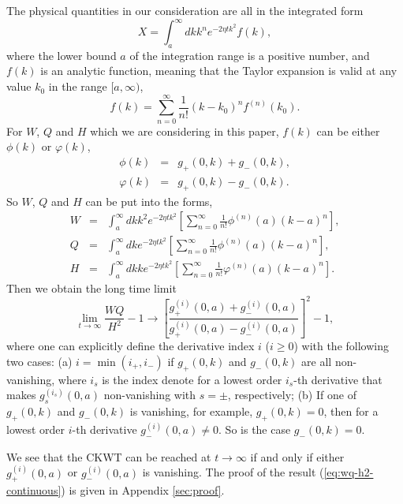 \documentclass[english,aps,superscriptaddress,preprint]{revtex4-1}
\begin{document}
The physical quantities in our consideration are all in the integrated
form 
\begin{equation}
X=\int_{a}^{\infty}dkk^{n}e^{-2\eta tk^{2}}f(k),
\end{equation}
where the lower bound $a$ of the integration range is a positive
number, and $f(k)$ is an analytic function, meaning that the Taylor
expansion is valid at any value $k_{0}$ in the range $[a,\infty)$,
\begin{equation}
f(k)=\sum_{n=0}^{\infty}\frac{1}{n!}\left(k-k_{0}\right)^{n}f^{(n)}(k_{0}).
\end{equation}
For $W$, $Q$ and $H$ which we are considering in this paper, $f(k)$
can be either $\phi(k)$ or $\varphi(k)$, 
\begin{eqnarray}
\phi(k) & = & g_{+}(0,k)+g_{-}(0,k),\nonumber \\
\varphi(k) & = & g_{+}(0,k)-g_{-}(0,k).\label{eq:phi-beta}
\end{eqnarray}
So $W$, $Q$ and $H$ can be put into the forms, 
\begin{eqnarray}
W & = & \int_{a}^{\infty}dkk^{2}e^{-2\eta tk^{2}}\left[\sum_{n=0}^{\infty}\frac{1}{n!}\phi^{(n)}(a)\left(k-a\right)^{n}\right],\nonumber \\
Q & = & \int_{a}^{\infty}dke^{-2\eta tk^{2}}\left[\sum_{n=0}^{\infty}\frac{1}{n!}\phi^{(n)}(a)\left(k-a\right)^{n}\right],\nonumber \\
H & = & \int_{a}^{\infty}dkke^{-2\eta tk^{2}}\left[\sum_{n=0}^{\infty}\frac{1}{n!}\varphi^{(n)}\left(a\right)\left(k-a\right)^{n}\right].
\end{eqnarray}
Then we obtain the long time limit 
\begin{equation}
\lim_{t\rightarrow\infty}\frac{WQ}{H^{2}}-1\rightarrow\left[\frac{g_{+}^{(i)}(0,a)+g_{-}^{(i)}(0,a)}{g_{+}^{(i)}(0,a)-g_{-}^{(i)}(0,a)}\right]^{2}-1,\label{eq:wq-h2-continuous}
\end{equation}
where one can explicitly define the derivative index $i$ ($i\geq0$)
with the following two cases: (a) $i=\min(i_{+},i_{-})$ if $g_{+}(0,k)$
and $g_{-}(0,k)$ are all non-vanishing, where $i_{s}$ is the index
denote for a lowest order $i_{s}$-th derivative that makes $g_{s}^{(i_{s})}(0,a)$
non-vanishing with $s=\pm$, respectively; (b) If one of $g_{+}(0,k)$
and $g_{-}(0,k)$ is vanishing, for example, $g_{+}(0,k)=0$, then
for a lowest order $i$-th derivative $g_{-}^{(i)}(0,a)\neq0$. So
is the case $g_{-}(0,k)=0$.

We see that the CKWT can be reached at $t\rightarrow\infty$ if and
only if either $g_{+}^{(i)}(0,a)$ or $g_{-}^{(i)}(0,a)$ is vanishing.
The proof of the result (\ref{eq:wq-h2-continuous}) is given in Appendix
\ref{sec:proof}.
\end{document}
